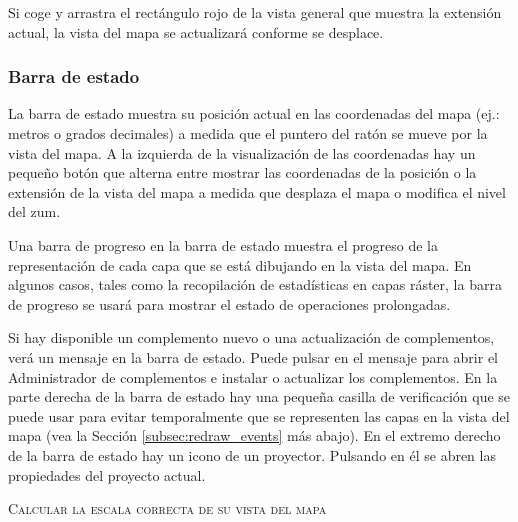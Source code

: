 Si coge y arrastra el rectángulo rojo de la vista general que muestra la extensión actual, la vista 
del mapa se actualizará conforme se desplace.

\subsubsection{Barra de estado}\label{label_statusbar}

La barra de estado muestra su posición actual en las coordenadas del mapa (ej.: 
metros o grados decimales) a medida que el puntero del ratón se mueve por la vista del mapa. 
A la izquierda de la visualización de las coordenadas hay un pequeño botón que alterna entre 
mostrar las coordenadas de la posición o la extensión de la 
vista del mapa a medida que desplaza el mapa o modifica el nivel del zum. 

Una barra de progreso en la barra de estado muestra el progreso de la representación de cada capa que se está 
dibujando en la vista del mapa. En algunos casos, tales como la recopilación de estadísticas en capas ráster, 
la barra de progreso se usará para mostrar el estado de operaciones prolongadas.

Si hay disponible un complemento nuevo o una actualización de complementos, verá un mensaje en la barra de estado. 
Puede pulsar en el mensaje para abrir el Administrador de complementos e instalar o actualizar los complementos.
En la parte derecha de la barra de estado hay una pequeña casilla de verificación 
que se puede usar para 
evitar temporalmente que se representen las capas en la vista del mapa (vea la Sección 
\ref{subsec:redraw_events} más abajo). 
En el extremo derecho de la barra de estado hay un icono de un proyector. 
Pulsando en él se abren 
las propiedades del proyecto actual.

\begin{Tip}\caption{\textsc{Calcular la escala correcta de su vista del mapa}}
\end{Tip}


